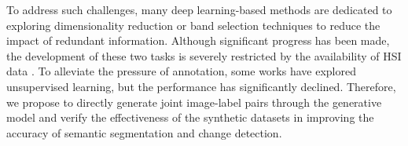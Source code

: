 To address such challenges, many deep learning-based methods \cite{chen2016deep, sun2019hyperspectral} are dedicated to exploring dimensionality reduction or band selection techniques to reduce the impact of redundant information. Although significant progress has been made, the development of these two tasks is severely restricted by the availability of HSI data \cite{li2019deep,liu2019review}. 
To alleviate the pressure of annotation, some works \cite{10354413, Gao_2021_CVPR,manas2021seasonal} have explored unsupervised learning, but the performance has significantly declined. Therefore, we propose to directly generate joint image-label pairs through the generative model and verify the effectiveness of the synthetic datasets in improving the accuracy of semantic segmentation and change detection.
